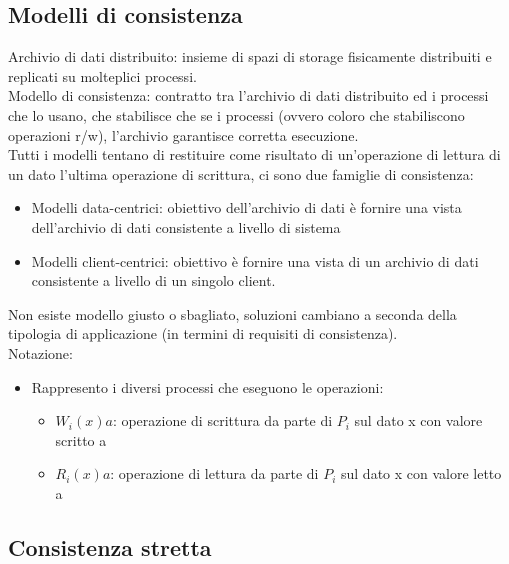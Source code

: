 \documentclass[16px]{article}
\begin{document}
\subsection{Modelli di consistenza}
Archivio di dati distribuito: insieme di spazi di storage fisicamente distribuiti e replicati su molteplici processi.\\ Modello di consistenza: contratto tra l'archivio di dati distribuito ed i processi che lo usano, che stabilisce che se i processi (ovvero coloro che stabiliscono operazioni r/w), l'archivio garantisce corretta esecuzione.\\ Tutti i modelli tentano di restituire come risultato di un'operazione di lettura di un dato l'ultima operazione di scrittura,  ci sono due famiglie di consistenza:
\begin{itemize}
\item Modelli data-centrici: obiettivo dell'archivio di dati è fornire una vista dell'archivio di dati consistente a livello di sistema
\item Modelli client-centrici: obiettivo è fornire una vista di un archivio di dati consistente a livello di un singolo client.
\end{itemize}
Non esiste modello giusto o sbagliato, soluzioni cambiano a seconda della tipologia di applicazione (in termini di requisiti di consistenza).\\ Notazione:
\begin{itemize}
\item Rappresento i diversi processi che eseguono le operazioni:
\begin{itemize}
\item $W_i(x)a$: operazione di scrittura da parte di $P_i$ sul dato x con valore scritto a
\item $R_i(x)a$: operazione di lettura da parte di $P_i$ sul dato x con valore letto a
\end{itemize}
\end{itemize}
\subsection{Consistenza stretta}
\end{document}
